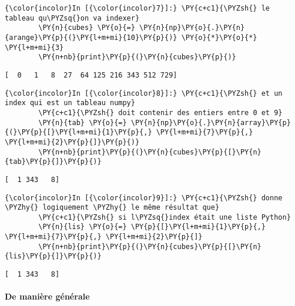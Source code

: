     \begin{Verbatim}[commandchars=\\\{\}]
{\color{incolor}In [{\color{incolor}7}]:} \PY{c+c1}{\PYZsh{} le tableau qu\PYZsq{}on va indexer}
        \PY{n}{cubes} \PY{o}{=} \PY{n}{np}\PY{o}{.}\PY{n}{arange}\PY{p}{(}\PY{l+m+mi}{10}\PY{p}{)} \PY{o}{*}\PY{o}{*} \PY{l+m+mi}{3}
        \PY{n+nb}{print}\PY{p}{(}\PY{n}{cubes}\PY{p}{)}
\end{Verbatim}


    \begin{Verbatim}[commandchars=\\\{\}]
[  0   1   8  27  64 125 216 343 512 729]

    \end{Verbatim}

    \begin{Verbatim}[commandchars=\\\{\}]
{\color{incolor}In [{\color{incolor}8}]:} \PY{c+c1}{\PYZsh{} et un index qui est un tableau numpy}
        \PY{c+c1}{\PYZsh{} doit contenir des entiers entre 0 et 9}
        \PY{n}{tab} \PY{o}{=} \PY{n}{np}\PY{o}{.}\PY{n}{array}\PY{p}{(}\PY{p}{[}\PY{l+m+mi}{1}\PY{p}{,} \PY{l+m+mi}{7}\PY{p}{,} \PY{l+m+mi}{2}\PY{p}{]}\PY{p}{)}
        \PY{n+nb}{print}\PY{p}{(}\PY{n}{cubes}\PY{p}{[}\PY{n}{tab}\PY{p}{]}\PY{p}{)}
\end{Verbatim}


    \begin{Verbatim}[commandchars=\\\{\}]
[  1 343   8]

    \end{Verbatim}

    \begin{Verbatim}[commandchars=\\\{\}]
{\color{incolor}In [{\color{incolor}9}]:} \PY{c+c1}{\PYZsh{} donne \PYZhy{} logiquement \PYZhy{} le même résultat que}
        \PY{c+c1}{\PYZsh{} si l\PYZsq{}index était une liste Python}
        \PY{n}{lis} \PY{o}{=} \PY{p}{[}\PY{l+m+mi}{1}\PY{p}{,} \PY{l+m+mi}{7}\PY{p}{,} \PY{l+m+mi}{2}\PY{p}{]}
        \PY{n+nb}{print}\PY{p}{(}\PY{n}{cubes}\PY{p}{[}\PY{n}{lis}\PY{p}{]}\PY{p}{)}
\end{Verbatim}


    \begin{Verbatim}[commandchars=\\\{\}]
[  1 343   8]

    \end{Verbatim}

    \hypertarget{de-maniuxe8re-guxe9nuxe9rale}{%
\paragraph{De manière générale}\label{de-maniuxe8re-guxe9nuxe9rale}}

